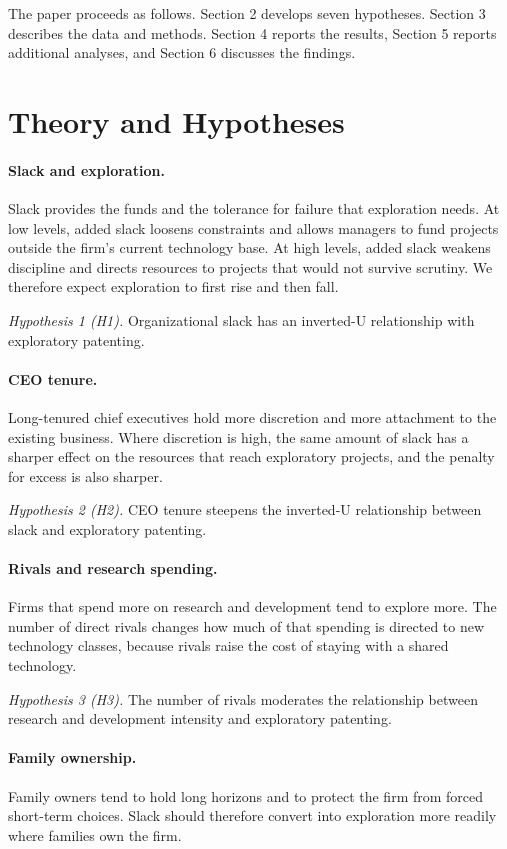 \documentclass[11pt]{article}
\begin{document}
The paper proceeds as follows. Section 2 develops seven hypotheses. Section 3 describes the data and methods. Section 4 reports the results, Section 5 reports additional analyses, and Section 6 discusses the findings.

\section{Theory and Hypotheses}

\paragraph{Slack and exploration.} Slack provides the funds and the tolerance for failure that exploration needs. At low levels, added slack loosens constraints and allows managers to fund projects outside the firm's current technology base. At high levels, added slack weakens discipline and directs resources to projects that would not survive scrutiny. We therefore expect exploration to first rise and then fall.

\emph{Hypothesis 1 (H1).} Organizational slack has an inverted-U relationship with exploratory patenting.

\paragraph{CEO tenure.} Long-tenured chief executives hold more discretion and more attachment to the existing business. Where discretion is high, the same amount of slack has a sharper effect on the resources that reach exploratory projects, and the penalty for excess is also sharper.

\emph{Hypothesis 2 (H2).} CEO tenure steepens the inverted-U relationship between slack and exploratory patenting.

\paragraph{Rivals and research spending.} Firms that spend more on research and development tend to explore more. The number of direct rivals changes how much of that spending is directed to new technology classes, because rivals raise the cost of staying with a shared technology.

\emph{Hypothesis 3 (H3).} The number of rivals moderates the relationship between research and development intensity and exploratory patenting.

\paragraph{Family ownership.} Family owners tend to hold long horizons and to protect the firm from forced short-term choices. Slack should therefore convert into exploration more readily where families own the firm.
\end{document}
